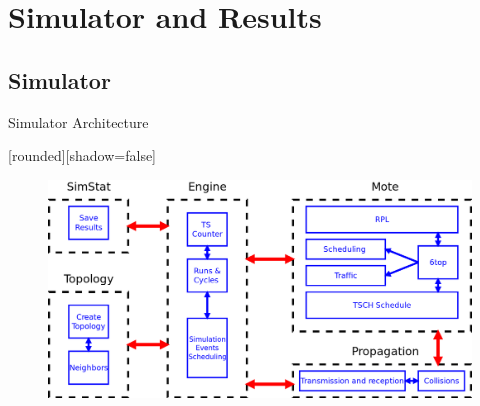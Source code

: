 \section{Simulator and Results}
\subsection{Simulator}
\addtocounter{framenumber}{-1}
\begin{withoutheadline}
\begin{frame}{Simulator Architecture}


[rounded][shadow=false]

\begin{figure}[p]

\includegraphics[width=\linewidth]{figures/SIM.png}

\end{figure}



\end{frame}
\end{withoutheadline}


